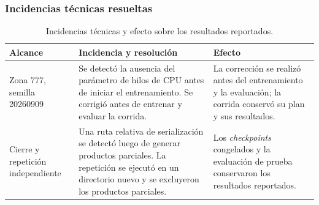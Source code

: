 \subsubsection*{Incidencias técnicas resueltas}

\begin{table}[H]
  \centering
  \small
  \caption{Incidencias técnicas y efecto sobre los resultados reportados.}
  \label{tab:anexo_incidencias}
  \begin{tabularx}{\textwidth}{@{}p{}p{}X@{}}
    \toprule
    \textbf{Alcance} & \textbf{Incidencia y resolución} & \textbf{Efecto} \\
    \midrule
    Zona 777, semilla 20260909 &
    Se detectó la ausencia del parámetro de hilos de CPU antes de iniciar el entrenamiento. Se corrigió antes de entrenar y evaluar la corrida. &
    La corrección se realizó antes del entrenamiento y la evaluación; la corrida conservó su plan y sus resultados. \\
    Cierre y repetición independiente &
    Una ruta relativa de serialización se detectó luego de generar productos parciales. La repetición se ejecutó en un directorio nuevo y se excluyeron los productos parciales. &
    Los \textit{checkpoints} congelados y la evaluación de prueba conservaron los resultados reportados. \\
    \bottomrule
  \end{tabularx}
\end{table}

